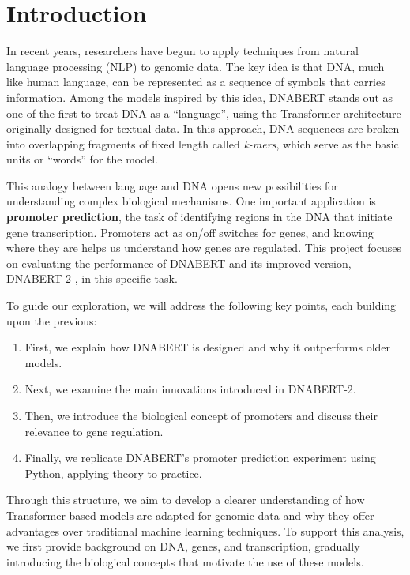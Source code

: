 \section{Introduction}

In recent years, researchers have begun to apply techniques from natural language processing (NLP) to genomic data. The key idea is that DNA, much like human language, can be represented as a sequence of symbols that carries information. Among the models inspired by this idea, DNABERT \cite{10.1093/bioinformatics/btab083} stands out as one of the first to treat DNA as a “language”, using the Transformer architecture originally designed for textual data. In this approach, DNA sequences are broken into overlapping fragments of fixed length called \textit{k-mers}, which serve as the basic units or “words” for the model.

This analogy between language and DNA opens new possibilities for understanding complex biological mechanisms. One important application is \textbf{promoter prediction}, the task of identifying regions in the DNA that initiate gene transcription. Promoters act as on/off switches for genes, and knowing where they are helps us understand how genes are regulated. This project focuses on evaluating the performance of DNABERT and its improved version, DNABERT-2 \cite{zhou2024dnabert2efficientfoundationmodel}, in this specific task.

To guide our exploration, we will address the following key points, each building upon the previous:
\begin{enumerate}
    \item First, we explain how DNABERT is designed and why it outperforms older models.
    \item Next, we examine the main innovations introduced in DNABERT-2.
    \item Then, we introduce the biological concept of promoters and discuss their relevance to gene regulation.
    \item Finally, we replicate DNABERT's promoter prediction experiment using Python, applying theory to practice.
\end{enumerate}

Through this structure, we aim to develop a clearer understanding of how Transformer-based models are adapted for genomic data and why they offer advantages over traditional machine learning techniques. To support this analysis, we first provide background on DNA, genes, and transcription, gradually introducing the biological concepts that motivate the use of these models.

